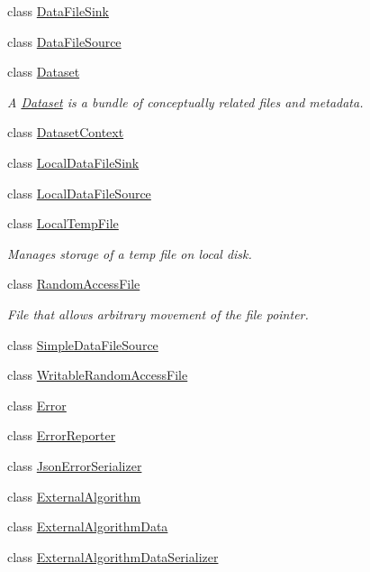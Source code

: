 \begin{DoxyCompactItemize}
class \hyperlink{classBUSBOY_1_1DataFileSink}{DataFileSink}
\item 
class \hyperlink{classBUSBOY_1_1DataFileSource}{DataFileSource}
\item 
class \hyperlink{classBUSBOY_1_1Dataset}{Dataset}
\begin{DoxyCompactList}\small\item\em A \hyperlink{classBUSBOY_1_1Dataset}{Dataset} is a bundle of conceptually related files and metadata. \item\end{DoxyCompactList}\item 
class \hyperlink{classBUSBOY_1_1DatasetContext}{DatasetContext}
\item 
class \hyperlink{classBUSBOY_1_1LocalDataFileSink}{LocalDataFileSink}
\item 
class \hyperlink{classBUSBOY_1_1LocalDataFileSource}{LocalDataFileSource}
\item 
class \hyperlink{classBUSBOY_1_1LocalTempFile}{LocalTempFile}
\begin{DoxyCompactList}\small\item\em Manages storage of a temp file on local disk. \item\end{DoxyCompactList}\item 
class \hyperlink{classBUSBOY_1_1RandomAccessFile}{RandomAccessFile}
\begin{DoxyCompactList}\small\item\em File that allows arbitrary movement of the file pointer. \item\end{DoxyCompactList}\item 
class \hyperlink{classBUSBOY_1_1SimpleDataFileSource}{SimpleDataFileSource}
\item 
class \hyperlink{classBUSBOY_1_1WritableRandomAccessFile}{WritableRandomAccessFile}
\item 
class \hyperlink{classBUSBOY_1_1Error}{Error}
\item 
class \hyperlink{classBUSBOY_1_1ErrorReporter}{ErrorReporter}
\item 
class \hyperlink{classBUSBOY_1_1JsonErrorSerializer}{JsonErrorSerializer}
\item 
class \hyperlink{classBUSBOY_1_1ExternalAlgorithm}{ExternalAlgorithm}
\item 
class \hyperlink{classBUSBOY_1_1ExternalAlgorithmData}{ExternalAlgorithmData}
\item 
class \hyperlink{classBUSBOY_1_1ExternalAlgorithmDataSerializer}{ExternalAlgorithmDataSerializer}

\end{DoxyCompactItemize}
